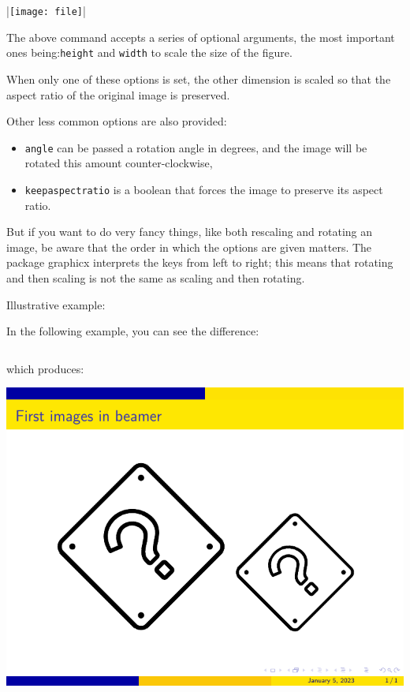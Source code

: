 |\texttt{[image: file]}|

The above command accepts a series of optional arguments, the most important ones being:\verb|height| and \verb|width| to scale the size of the figure.

When only one of these options is set, the other dimension is scaled so that the aspect ratio of the original image is preserved.

Other less common options are also provided:

\begin{itemize}
  \item \verb|angle| can be passed a rotation angle in degrees, and the image will be rotated this amount counter-clockwise,
  \item \verb|keepaspectratio| is a boolean that forces the image to preserve its aspect ratio.
\end{itemize}

But if you want to do very fancy things, like both rescaling and rotating an image, be aware that the order in which the options are given matters. The package graphicx interprets the keys from left to right; this means that rotating and then scaling is not the same as scaling and then rotating.

Illustrative example:

In the following example, you can see the difference:

\inputminted[linenos=true]{latex}{examples/beamer/figure-rotation.tex}

which produces:

\includegraphics{examples/beamer/figure-rotation.pdf}

